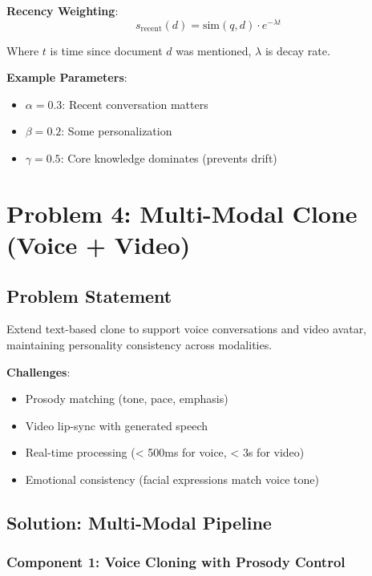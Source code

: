 \documentclass[10pt]{article}
\begin{document}
\textbf{Recency Weighting}:
\[
s_{\text{recent}}(d) = \text{sim}(q, d) \cdot e^{-\lambda t}
\]

Where $t$ is time since document $d$ was mentioned, $\lambda$ is decay rate.

\textbf{Example Parameters}:
\begin{itemize}[leftmargin=*]
    \item $\alpha = 0.3$: Recent conversation matters
    \item $\beta = 0.2$: Some personalization
    \item $\gamma = 0.5$: Core knowledge dominates (prevents drift)
\end{itemize}

\section{Problem 4: Multi-Modal Clone (Voice + Video)}

\subsection{Problem Statement}

Extend text-based clone to support voice conversations and video avatar, maintaining personality consistency across modalities.

\textbf{Challenges}:
\begin{itemize}[leftmargin=*]
    \item Prosody matching (tone, pace, emphasis)
    \item Video lip-sync with generated speech
    \item Real-time processing (< 500ms for voice, < 3s for video)
    \item Emotional consistency (facial expressions match voice tone)
\end{itemize}

\subsection{Solution: Multi-Modal Pipeline}

\subsubsection{Component 1: Voice Cloning with Prosody Control}
\end{document}
